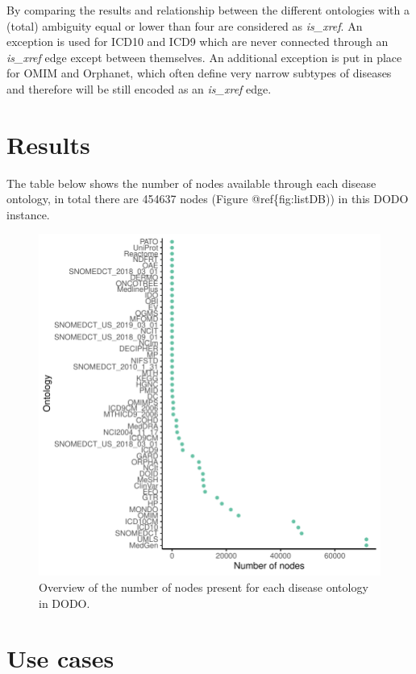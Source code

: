 \documentclass[9pt,a4paper,]{extarticle}
\begin{document}
By comparing the results and relationship between the different ontologies with a (total) ambiguity equal or lower than four are considered as \emph{is\_xref}. An exception is used for ICD10 and ICD9 which are never connected through an \emph{is\_xref} edge except between themselves. An additional exception is put in place for OMIM and Orphanet, which often define very narrow subtypes of diseases and therefore will be still encoded as an \emph{is\_xref} edge.

\hypertarget{results}{%
\section{Results}\label{results}}

The table below shows the number of nodes available through each disease ontology, in total there are 454637 nodes (Figure @ref\{fig:listDB)) in this DODO instance.

\begin{figure}

{\centering \includegraphics[width=0.75\linewidth]{DODO_publication_files/figure-latex/listDB-1} 

}

\caption{Overview of the number of nodes present for each disease ontology in DODO.}\label{fig:listDB}
\end{figure}

\hypertarget{use-cases}{%
\section{Use cases}\label{use-cases}}
\end{document}
